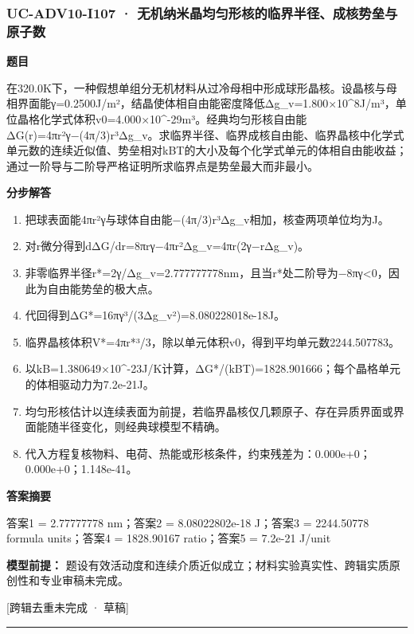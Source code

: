 \documentclass[UTF8,11pt,a4paper]{ctexart}
\begin{document}
\subsubsection*{UC-ADV10-I107 · 无机纳米晶均匀形核的临界半径、成核势垒与原子数}
\noindent\textbf{题目}\par
在320.0K下，一种假想单组分无机材料从过冷母相中形成球形晶核。设晶核与母相界面能γ=0.2500J/m²，结晶使体相自由能密度降低Δg\_v=1.800×10\textasciicircum{}8J/m³，单位晶格化学式体积v0=4.000×10\textasciicircum{}-29m³。经典均匀形核自由能ΔG(r)=4πr²γ−(4π/3)r³Δg\_v。求临界半径、临界成核自由能、临界晶核中化学式单元数的连续近似值、势垒相对kBT的大小及每个化学式单元的体相自由能收益；通过一阶导与二阶导严格证明所求临界点是势垒最大而非最小。\par
\medskip\noindent\textbf{分步解答}
\begin{enumerate}
\item 把球表面能4πr²γ与球体自由能−(4π/3)r³Δg\_v相加，核查两项单位均为J。
\item 对r微分得到dΔG/dr=8πrγ−4πr²Δg\_v=4πr(2γ−rΔg\_v)。
\item 非零临界半径r*=2γ/Δg\_v=2.777777778nm，且当r*处二阶导为−8πγ<0，因此为自由能势垒的极大点。
\item 代回得到ΔG*=16πγ³/(3Δg\_v²)=8.080228018e-18J。
\item 临界晶核体积V*=4πr*³/3，除以单元体积v0，得到平均单元数2244.507783。
\item 以kB=1.380649×10\textasciicircum{}-23J/K计算，ΔG*/(kBT)=1828.901666；每个晶格单元的体相驱动力为7.2e-21J。
\item 均匀形核估计以连续表面为前提，若临界晶核仅几颗原子、存在异质界面或界面能随半径变化，则经典球模型不精确。
\item 代入方程复核物料、电荷、热能或形核条件，约束残差为：0.000e+0；0.000e+0；1.148e-41。
\end{enumerate}
\noindent\textbf{答案摘要}\par
答案1 = 2.77777778 nm；答案2 = 8.08022802e-18 J；答案3 = 2244.50778 formula units；答案4 = 1828.90167 ratio；答案5 = 7.2e-21 J/unit\par
\noindent\textbf{模型前提：}
题设有效活动度和连续介质近似成立；材料实验真实性、跨辑实质原创性和专业审稿未完成。\par
\noindent\textcolor{red!65!black}{[跨辑去重未完成 · 草稿]} \par
\medskip\hrule\medskip
{}
\end{document}
